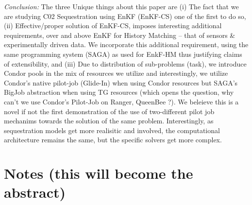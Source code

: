 \documentclass[conference,final]{IEEEtran}
\begin{document}
{\it Conclusion: } The three Unique things about this paper are (i) The fact that we are studying C02 Sequestration using EnKF 
(EnKF-CS) one of the first to do so, (ii) Effective/proper solution of EnKF-CS, imposes interesting additional requirements, over 
and above EnKF for History Matching -- that of sensors \& experimentally driven data. We incorporate this additional requirement, 
using the same programming system (SAGA) as used for EnkF-HM thus justifying claims of extensibility, and (iii) Due to 
distribution of sub-problems (task), we introduce Condor pools in the mix of resources we utilize and interestingly, we utilize 
Condor's native pilot-job (Glide-In) when using Condor resources but SAGA's BigJob abstraction when using TG resources (which 
opens the question, why can't we use Condor's Pilot-Job on Ranger, QueenBee ?). We beleieve this is a novel if not the first 
demonstration of the use of two-different pilot job mechanims towards the solution of the same problem. Interestingly, as 
sequestration models get more realisitic and involved, the computational architecture remains the same, but the specific solvers 
get more complex.


\section*{Notes (this will become the abstract)}
\end{document}
